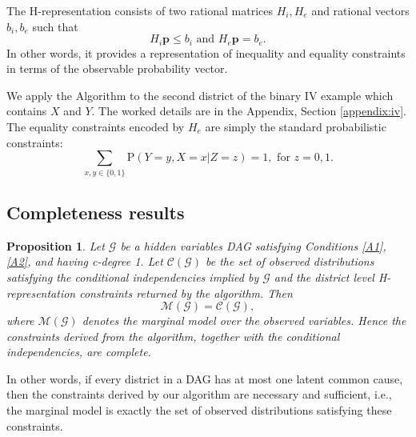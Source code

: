 \documentclass[12pt]{article}
\newtheorem{proposition}{Proposition}
\newtheorem{definition}{Definition}
\def\Pr{{\mathrm{P}}}
\begin{document}
The H-representation consists of two rational matrices $H_i, H_e$ and rational vectors $b_i, b_e$ such that 
\[
H_i \boldsymbol{p} \leq b_i
\mbox{ and }
H_e \boldsymbol{p} = b_e. 
\]
In other words, it provides a representation of inequality and equality constraints in terms of the observable probability vector. 

We apply the Algorithm to the second district of the binary IV example which contains $X$ and $Y$. The worked details are in the Appendix, Section \ref{appendix:iv}. The equality constraints encoded by $H_e$ are simply the standard probabilistic constraints:
\begin{equation}
\sum_{x, y \in \{0, 1\}} \Pr(Y = y, X = x | Z = z) = 1, \mbox{ for } z = 0, 1. \label{eqn:ivex}
\end{equation}


\subsection{Completeness results} \label{sec:complete}





\begin{proposition} \label{prop:complete}
 Let $\mathcal{G}$ be a hidden variables DAG satisfying Conditions \ref{A1}, \ref{A2}, and having c-degree 1. Let $\mathcal{C}(\mathcal{G})$ be the set of observed distributions satisfying the conditional independencies implied by $\mathcal{G}$ and the district level H-representation constraints returned by the algorithm. Then
\[
    \mathcal{M}(\mathcal{G}) = \mathcal{C}(\mathcal{G}),
\]
where $\mathcal{M}(\mathcal{G})$ denotes the marginal model over the observed variables. Hence the constraints derived from the algorithm, together with the conditional independencies, are complete.
\end{proposition}

In other words, if every district in a DAG has at most one latent common cause, then the constraints derived by our algorithm are necessary and sufficient, i.e., the marginal model is exactly the set of observed distributions satisfying these constraints.
\end{document}
